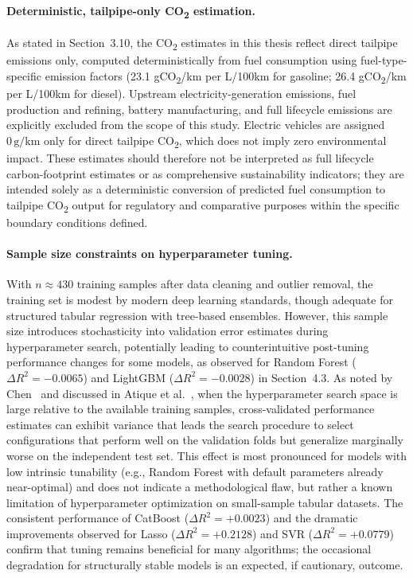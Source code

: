 \paragraph{Deterministic, tailpipe-only CO\textsubscript{2} estimation.}
As stated in Section~3.10, the CO\textsubscript{2} estimates in this thesis reflect direct tailpipe emissions only, computed deterministically from fuel consumption using fuel-type-specific emission factors (23.1 gCO\textsubscript{2}/km per L/100km for gasoline; 26.4 gCO\textsubscript{2}/km per L/100km for diesel). Upstream electricity-generation emissions, fuel production and refining, battery manufacturing, and full lifecycle emissions are explicitly excluded from the scope of this study. Electric vehicles are assigned \(0\,\text{g/km}\) only for direct tailpipe CO\textsubscript{2}, which does not imply zero environmental impact. These estimates should therefore not be interpreted as full lifecycle carbon-footprint estimates or as comprehensive sustainability indicators; they are intended solely as a deterministic conversion of predicted fuel consumption to tailpipe CO\textsubscript{2} output for regulatory and comparative purposes within the specific boundary conditions defined.

\paragraph{Sample size constraints on hyperparameter tuning.}
With \(n \approx 430\) training samples after data cleaning and outlier removal, the training set is modest by modern deep learning standards, though adequate for structured tabular regression with tree-based ensembles. However, this sample size introduces stochasticity into validation error estimates during hyperparameter search, potentially leading to counterintuitive post-tuning performance changes for some models, as observed for Random Forest (\(\Delta R^2 = -0.0065\)) and LightGBM (\(\Delta R^2 = -0.0028\)) in Section~4.3. As noted by Chen~\cite{chen2025need} and discussed in Atique et al.~\cite{atique2026explainable}, when the hyperparameter search space is large relative to the available training samples, cross-validated performance estimates can exhibit variance that leads the search procedure to select configurations that perform well on the validation folds but generalize marginally worse on the independent test set. This effect is most pronounced for models with low intrinsic tunability (e.g., Random Forest with default parameters already near-optimal) and does not indicate a methodological flaw, but rather a known limitation of hyperparameter optimization on small-sample tabular datasets. The consistent performance of CatBoost (\(\Delta R^2 = +0.0023\)) and the dramatic improvements observed for Lasso (\(\Delta R^2 = +0.2128\)) and SVR (\(\Delta R^2 = +0.0779\)) confirm that tuning remains beneficial for many algorithms; the occasional degradation for structurally stable models is an expected, if cautionary, outcome.




